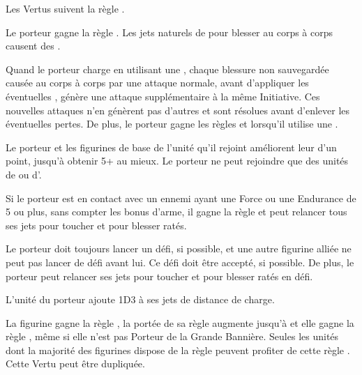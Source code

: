 \closearmyspecialrules







\vspace{0.5cm}

\begin{center}Les Vertus suivent la règle \oneperarmy{}.\end{center}

\begin{multicols}{2}\raggedcolumns
\startpricelistNSP

 Le porteur gagne la règle . Les jets naturels de  pour blesser au corps à corps causent des \multiplewounds{\ordnance}{}.

 Quand le porteur charge en utilisant une \lance{}, chaque blessure non sauvegardée causée au corps à corps par une attaque normale, avant d'appliquer les éventuelles \multiplewounds{}{}, génère une attaque supplémentaire à la même Initiative. Ces nouvelles attaques n'en génèrent pas d'autres et sont résolues avant d'enlever les éventuelles pertes. De plus, le porteur gagne les règles \devastatingcharge{} et \thunderouscharge{} lorsqu'il utilise une \lance{}.

 Le porteur et les figurines de base de l'unité qu'il rejoint améliorent leur \wardsave{} d'un point, jusqu'à obtenir 5+ au mieux. Le porteur ne peut rejoindre que des unités de \cavalry{} ou d'\infantry{}.

 Si le porteur est en contact avec un ennemi ayant une Force ou une Endurance de 5 ou plus, sans compter les bonus d'arme, il gagne la règle \stubborn{} et peut relancer tous ses jets pour toucher et pour blesser ratés.

\columnbreak
{} Le porteur doit toujours lancer un défi, si possible, et une autre figurine alliée ne peut pas lancer de défi avant lui. Ce défi doit être accepté, si possible. De plus, le porteur peut relancer ses jets pour toucher et pour blesser ratés en défi.

 L'unité du porteur ajoute 1D3 à ses jets de distance de charge.

 La figurine gagne la règle \insignificant{}, la portée de sa règle \inspiringpresence{} augmente jusqu'à  et elle gagne la règle \holdyourground{}, même si elle n'est pas Porteur de la Grande Bannière. Seules les unités dont la majorité des figurines dispose de la règle \insignificant{} peuvent profiter de cette règle \holdyourground{}. Cette Vertu peut être dupliquée.

\endpricelistNSP
\end{multicols}

